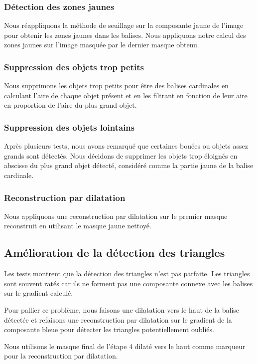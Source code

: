 \documentclass{article}
\begin{document}
\subsubsection{Détection des zones jaunes}
Nous réappliquons la méthode de seuillage sur la composante jaune de l'image
pour obtenir les zones jaunes dans les balises. Nous appliquons notre calcul
des zones jaunes sur l'image masquée par le dernier masque obtenu.

\subsubsection{Suppression des objets trop petits}
Nous supprimons les objets trop petits pour être des balises cardinales en
calculant l'aire de chaque objet présent et en les filtrant en fonction de leur
aire en proportion de l'aire du plus grand objet.

\subsubsection{Suppression des objets lointains}
Après plusieurs tests, nous avons remarqué que certaines bouées ou objets assez
grands sont détectés. Nous décidons de supprimer les objets trop éloignés en
abscisse du plus grand objet détecté, considéré comme la partie jaune de la
balise cardinale.

\subsubsection{Reconstruction par dilatation}

Nous appliquons une reconstruction par dilatation sur le premier masque
reconstruit en utilisant le masque jaune nettoyé.

\subsection{Amélioration de la détection des triangles}

Les tests montrent que la détection des triangles n'est pas parfaite. Les
triangles sont souvent ratés car ils ne forment pas une composante connexe avec
les balises sur le gradient calculé.

Pour pallier ce problème, nous faisons une dilatation vers le haut de la balise
détectée et refaisons une reconstruction par dilatation sur le gradient de la
composante bleue pour détecter les triangles potentiellement oubliés.

Nous utilisons le masque final de l'étape 4 dilaté vers le haut comme marqueur
pour la reconstruction par dilatation.
\end{document}
